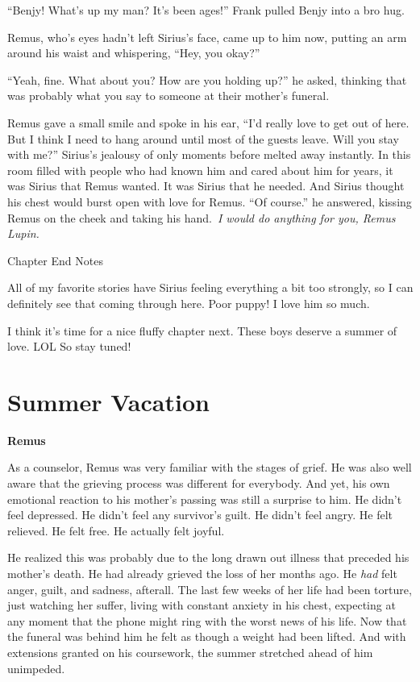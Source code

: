 \documentclass[12pt,twoside,openright]{memoir}
\begin{document}
``Benjy! What's up my man? It's been ages!'' Frank pulled Benjy into a bro hug. 

Remus, who's eyes hadn't left Sirius's face, came up to him now, putting an arm around his waist and whispering, ``Hey, you okay?''

``Yeah, fine. What about you? How are you holding up?'' he asked, thinking that was probably what you say to someone at their mother's funeral.

Remus gave a small smile and spoke in his ear, ``I'd really love to get out of here. But I think I need to hang around until most of the guests leave. Will you stay with me?'' Sirius's jealousy of only moments before melted away instantly. In this room filled with people who had known him and cared about him for years, it was Sirius that Remus wanted. It was Sirius that he needed. And Sirius thought his chest would burst open with love for Remus. ``Of course.'' he answered, kissing Remus on the cheek and taking his hand.\ \textit{I would do anything for you, Remus Lupin.}

Chapter End Notes

All of my favorite stories have Sirius feeling everything a bit too strongly, so I can definitely see that coming through here. Poor puppy! I love him so much. 

I think it's time for a nice fluffy chapter next. These boys deserve a summer of love. LOL So stay tuned!
\chapter{Summer Vacation}

\textbf{Remus} 

As a counselor, Remus was very familiar with the stages of grief. He was also well aware that the grieving process was different for everybody. And yet, his own emotional reaction to his mother's passing was still a surprise to him. He didn't feel depressed. He didn't feel any survivor's guilt. He didn't feel angry. He felt relieved. He felt free. He actually felt joyful.

He realized this was probably due to the long drawn out illness that preceded his mother's death. He had already grieved the loss of her months ago. He \textit{had} felt anger, guilt, and sadness, afterall. The last few weeks of her life had been torture, just watching her suffer, living with constant anxiety in his chest, expecting at any moment that the phone might ring with the worst news of his life. Now that the funeral was behind him he felt as though a weight had been lifted. And with extensions granted on his coursework, the summer stretched ahead of him unimpeded. 
\end{document}
